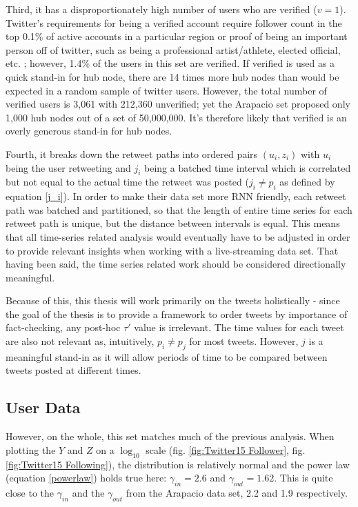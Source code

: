 \documentclass[NETN,manuscript]{stjour-new}
\begin{document}
Third, it has a disproportionately high number of users who are verified ($v = 1$). Twitter's requirements for being a verified account require follower count in the top 0.1\% of active accounts in a particular region or proof of being an important person off of twitter, such as being a professional artist/athlete, elected official, etc. \citep{twitter2020verified}; however, 1.4\% of the users in this set are verified. If verified is used as a quick stand-in for hub node, there are 14 times more hub nodes than would be expected in a random sample of twitter users. However, the total number of verified users is 3,061 with 212,360 unverified; yet the Arapacio set proposed only 1,000 hub nodes out of a set of 50,000,000. It's therefore likely that verified is an overly generous stand-in for hub nodes.

Fourth, it breaks down the retweet paths into ordered pairs $(u_i,z_i)$ with $u_i$ being the user retweeting and $j_i$ being a batched time interval which is correlated but not equal to the actual time the retweet was posted ($j_i \neq p_i$ as defined by equation \ref{j_i}). In order to make their data set more RNN friendly, each retweet path was batched and partitioned, so that the length of entire time series for each retweet path is unique, but the distance between intervals is equal. This means that all time-series related analysis would eventually have to be adjusted in order to provide relevant insights when working with a live-streaming data set. That having been said, the time series related work should be considered directionally meaningful.

Because of this, this thesis will work primarily on the tweets holistically - since the goal of the thesis is to provide a framework to order tweets by importance of fact-checking, any post-hoc $\tau'$ value is irrelevant. The time values for each tweet are also not relevant as, intuitively, $p_i \neq p_j$ for most tweets. However, $j$ is a meaningful stand-in as it will allow periods of time to be compared between tweets posted at different times. 

 \subsection{User Data}
However, on the whole, this set matches much of the previous analysis. When plotting the $Y$ and $Z$ on a $\log_{10}$ scale (fig. \ref{fig:Twitter15 Follower}, fig. \ref{fig:Twitter15 Following}), the distribution is relatively normal and the power law (equation \ref{powerlaw}) holds true here:  $\gamma_{in} = 2.6$ and $\gamma_{out} = 1.62$. This is quite close to the $\gamma_{in}$ and the $\gamma_{out}$  from the Arapacio data set, 2.2 and 1.9 respectively.
 
\end{document}
